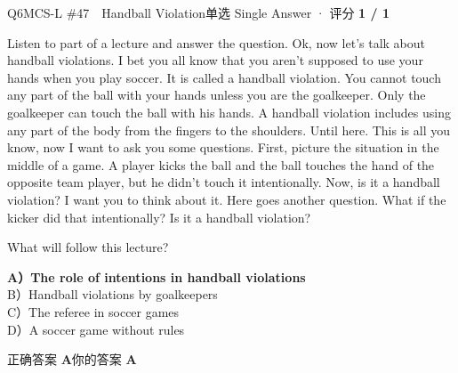 \begin{qblock}{Q6\quad MCS-L \#47\ \ Handball Violation}{单选 Single Answer · 评分 \textcolor{cAccent}{\bfseries 1 / 1}}
\begin{promptbox}
Listen to part of a lecture and answer the question. Ok, now let's talk about handball violations. I bet you all know that you aren't supposed to use your hands when you play soccer. It is called a handball violation. You cannot touch any part of the ball with your hands unless you are the goalkeeper. Only the goalkeeper can touch the ball with his hands. A handball violation includes using any part of the body from the fingers to the shoulders. Until here. This is all you know, now I want to ask you some questions. First, picture the situation in the middle of a game. A player kicks the ball and the ball touches the hand of the opposite team player, but he didn't touch it intentionally. Now, is it a handball violation? I want you to think about it. Here goes another question. What if the kicker did that intentionally? Is it a handball violation?
\end{promptbox}
\begin{notebox}\small What will follow this lecture?\end{notebox}
{\small
{\color{cFix}\textbf{A）The role of intentions in handball violations}}\\
B）Handball violations by goalkeepers\\
C）The referee in soccer games\\
D）A soccer game without rules}
\smallskip\par
{\small 正确答案 \textcolor{cFix}{\bfseries A}\qquad 你的答案 \textcolor{cFix}{\bfseries A}}
\end{qblock}

